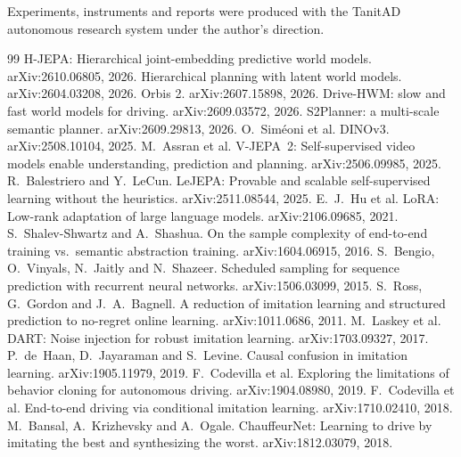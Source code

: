 \documentclass[10pt,twocolumn]{article}
\makeatletter
\theoremstyle{remark}
\renewcommand\paragraph{\@startsection{paragraph}{4}{\z@}{1.6ex \@plus .5ex \@minus .2ex}{-1em}{\normalfont\normalsize\bfseries}}
\makeatother
\begin{document}
\paragraph{Acknowledgements.} Experiments, instruments and reports were produced with the TanitAD autonomous research system under
the author's direction.

\begin{thebibliography}{99}\scriptsize\setlength{\itemsep}{0.5pt}\setlength{\parsep}{0pt}
 H-JEPA: Hierarchical joint-embedding predictive world models. arXiv:2610.06805, 2026.
 Hierarchical planning with latent world models. arXiv:2604.03208, 2026.
 Orbis 2. arXiv:2607.15898, 2026.
 Drive-HWM: slow and fast world models for driving. arXiv:2609.03572, 2026.
 S2Planner: a multi-scale semantic planner. arXiv:2609.29813, 2026.
 O.~Sim\'eoni et al. DINOv3. arXiv:2508.10104, 2025.
 M.~Assran et al. V-JEPA~2: Self-supervised video models enable understanding, prediction and planning. arXiv:2506.09985, 2025.
 R.~Balestriero and Y.~LeCun. LeJEPA: Provable and scalable self-supervised learning without the heuristics. arXiv:2511.08544, 2025.
 E.~J.~Hu et al. LoRA: Low-rank adaptation of large language models. arXiv:2106.09685, 2021.
 S.~Shalev-Shwartz and A.~Shashua. On the sample complexity of end-to-end training vs.\ semantic abstraction training. arXiv:1604.06915, 2016.
 S.~Bengio, O.~Vinyals, N.~Jaitly and N.~Shazeer. Scheduled sampling for sequence prediction with recurrent neural networks. arXiv:1506.03099, 2015.
 S.~Ross, G.~Gordon and J.~A.~Bagnell. A reduction of imitation learning and structured prediction to no-regret online learning. arXiv:1011.0686, 2011.
 M.~Laskey et al. DART: Noise injection for robust imitation learning. arXiv:1703.09327, 2017.
 P.~de~Haan, D.~Jayaraman and S.~Levine. Causal confusion in imitation learning. arXiv:1905.11979, 2019.
 F.~Codevilla et al. Exploring the limitations of behavior cloning for autonomous driving. arXiv:1904.08980, 2019.
 F.~Codevilla et al. End-to-end driving via conditional imitation learning. arXiv:1710.02410, 2018.
 M.~Bansal, A.~Krizhevsky and A.~Ogale. ChauffeurNet: Learning to drive by imitating the best and synthesizing the worst. arXiv:1812.03079, 2018.

\end{thebibliography}
\end{document}
